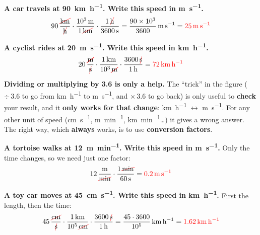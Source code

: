 \begin{example}
    \textbf{A car travels at \qty{90}{\km\per\hour}. Write this speed in \unit{\m\per\s}.}
    \begin{equation*}
        \num{90}\,\dfrac{\cancelunit{\km}}{\cancelunit{\hour}} \cdot \dfrac{\qty{e3}{\m}}{1\,\cancelunit{\km}} \cdot \dfrac{1\,\cancelunit{\hour}}{\qty{3600}{\s}} = \dfrac{\num{90e3}}{3600}\,\unit{\m\per\s} = \textcolor{red}{\qty{25}{\m\per\s}}
    \end{equation*}
\end{example}

\begin{example}
    \textbf{A cyclist rides at \qty{20}{\m\per\s}. Write this speed in \unit{\km\per\hour}.}
    \begin{equation*}
        \num{20}\,\dfrac{\cancelunit{\m}}{\cancelunit{\s}} \cdot \dfrac{\qty{1}{\km}}{\num{e3}\,\cancelunit{\m}} \cdot \dfrac{\num{3600}\,\cancelunit{\s}}{\qty{1}{\hour}} = \textcolor{red}{\qty{72}{\km\per\hour}}
    \end{equation*}
\end{example}

\begin{marker}
    \textbf{Dividing or multiplying by 3.6 is only a help.} The ``trick'' in the figure (\(\div\,3.6\) to go from \unit{\km\per\hour} to \unit{\m\per\s}, and \(\times\,3.6\) to go back) is only useful to \textbf{check} your result, and it \textbf{only works for that change}: \unit{\km\per\hour} \(\leftrightarrow\) \unit{\m\per\s}. For any other unit of speed (\unit{\cm\per\s}, \unit{\m\per\minute}, \unit{\km\per\minute}\ldots) it gives a wrong answer. The right way, which \textbf{always} works, is to use \textbf{conversion factors}.
\end{marker}

\begin{example}
    \textbf{A tortoise walks at \qty{12}{\m\per\minute}. Write this speed in \unit{\m\per\s}.} Only the time changes, so we need just one factor:
    \begin{equation*}
        \num{12}\,\dfrac{\unit{\m}}{\cancelunit{\minute}} \cdot \dfrac{1\,\cancelunit{\minute}}{\qty{60}{\s}} = \textcolor{red}{\qty{0.2}{\m\per\s}}
    \end{equation*}
\end{example}

\begin{example}
    \textbf{A toy car moves at \qty{45}{\cm\per\s}. Write this speed in \unit{\km\per\hour}.} First the length, then the time:
    \begin{equation*}
        \num{45}\,\dfrac{\cancelunit{\cm}}{\cancelunit{\s}} \cdot \dfrac{\qty{1}{\km}}{\num{e5}\,\cancelunit{\cm}} \cdot \dfrac{\num{3600}\,\cancelunit{\s}}{\qty{1}{\hour}} = \dfrac{\num{45} \cdot \num{3600}}{\num{e5}}\,\unit{\km\per\hour} = \textcolor{red}{\qty{1.62}{\km\per\hour}}
    \end{equation*}
\end{example}


